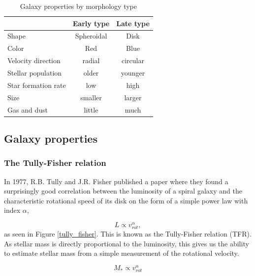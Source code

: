 \begin{table}
\begin{center}
\begin{tabular} { l| c c } 
 \hline
 \hline
  & Early type & Late type \\
 \hline
 Shape & Spheroidal & Disk \\
 Color & Red & Blue \\
 Velocity direction& radial & circular \\
 Stellar population & older & younger \\
 Star formation rate & low & high \\
 Size & smaller & larger \\
 Gas and dust & little & much \\
  
 \hline 
\end{tabular}
\end{center}
\caption{Galaxy properties by morphology type}
\label{morphologies}
\end{table}

\subsection{Galaxy properties}


\subsubsection{The Tully-Fisher relation}

In 1977, R.B. Tully and J.R. Fisher \parencite{TullyFisher1977} published a paper where they found a surprisingly good correlation between the luminosity of a spiral galaxy and the characteristic rotational speed of its disk on the form of a simple power law with index $\alpha$,

\begin{equation}
    L \propto v_{rot}^\alpha,
\end{equation}
as seen in Figure \ref{tully_fisher}. This is known as the Tully-Fisher relation (TFR). As stellar mass is directly proportional to the luminosity, this gives us the ability to estimate stellar mass from a simple measurement of the rotational velocity.

\begin{equation}
    M_* \propto v_{rot}^\alpha 
\end{equation}

